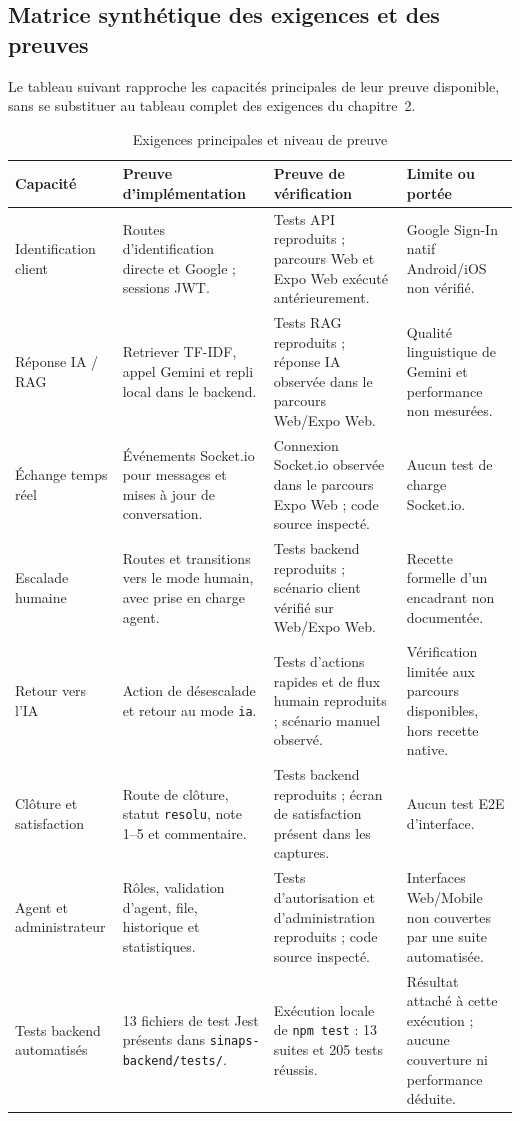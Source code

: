 \subsection{Matrice synthétique des exigences et des preuves}

Le tableau suivant rapproche les capacités principales de leur preuve disponible, sans se substituer au tableau complet des exigences du chapitre~2.

\begin{table}[H]
\centering
\caption{Exigences principales et niveau de preuve}
\label{tab:preuves}
\scriptsize
\begin{tabularx}{\textwidth}{|p{2.9cm}|X|X|p{3.3cm}|}
\hline
\textbf{Capacité} & \textbf{Preuve d'implémentation} & \textbf{Preuve de vérification} & \textbf{Limite ou portée} \\
\hline
Identification client & Routes d'identification directe et Google ; sessions JWT. & Tests API reproduits ; parcours Web et Expo Web exécuté antérieurement. & Google Sign-In natif Android/iOS non vérifié. \\
\hline
Réponse IA / RAG & Retriever TF-IDF, appel Gemini et repli local dans le backend. & Tests RAG reproduits ; réponse IA observée dans le parcours Web/Expo Web. & Qualité linguistique de Gemini et performance non mesurées. \\
\hline
Échange temps réel & Événements Socket.io pour messages et mises à jour de conversation. & Connexion Socket.io observée dans le parcours Expo Web ; code source inspecté. & Aucun test de charge Socket.io. \\
\hline
Escalade humaine & Routes et transitions vers le mode humain, avec prise en charge agent. & Tests backend reproduits ; scénario client vérifié sur Web/Expo Web. & Recette formelle d'un encadrant non documentée. \\
\hline
Retour vers l'IA & Action de désescalade et retour au mode \texttt{ia}. & Tests d'actions rapides et de flux humain reproduits ; scénario manuel observé. & Vérification limitée aux parcours disponibles, hors recette native. \\
\hline
Clôture et satisfaction & Route de clôture, statut \texttt{resolu}, note 1--5 et commentaire. & Tests backend reproduits ; écran de satisfaction présent dans les captures. & Aucun test E2E d'interface. \\
\hline
Agent et administrateur & Rôles, validation d'agent, file, historique et statistiques. & Tests d'autorisation et d'administration reproduits ; code source inspecté. & Interfaces Web/Mobile non couvertes par une suite automatisée. \\
\hline
Tests backend automatisés & 13 fichiers de test Jest présents dans \texttt{sinaps-backend/tests/}. & Exécution locale de \texttt{npm test} : 13 suites et 205 tests réussis. & Résultat attaché à cette exécution ; aucune couverture ni performance déduite. \\
\hline
\end{tabularx}
\end{table}

